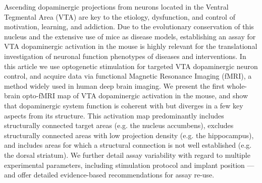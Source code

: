 Ascending dopaminergic projections from neurons located in the Ventral Tegmental Area (VTA) are key to the etiology, dysfunction, and control of motivation, learning, and addiction.
Due to the evolutionary conservation of this nucleus and the extensive use of mice as disease models, establishing an assay for VTA dopaminergic activation in the mouse is highly relevant for the translational investigation of neuronal function phenotypes of diseases and interventions.
In this article we use optogenetic stimulation for targeted VTA dopaminergic neuron control, and acquire data via functional Magnetic Resonance Imaging (fMRI), a method widely used in human deep brain imaging.
We present the first whole-brain opto-fMRI map of VTA dopaminergic activation in the mouse, and show that dopaminergic system function is coherent with but diverges in a few key aspects from its structure.
This activation map predominantly includes structurally connected target areas (e.g. the nucleus accumbens), excludes structurally connected areas with low projection density (e.g. the hippocampus), and includes areas for which a structural connection is not well established (e.g. the dorsal striatum).
We further detail assay variability with regard to multiple experimental parameters, including stimulation protocol and implant position --- and offer detailed evidence-based recommendations for assay re-use.
